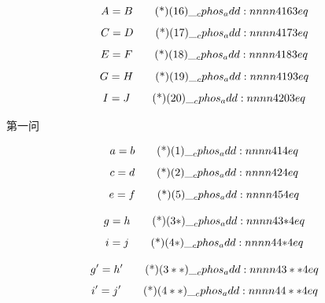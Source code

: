 \documentclass[answer]{cphos}
\begin{document}
\begin{problem}[30]{}
\begin{solution}
\begin{equation}
    A = B \eqtagscore{16}{3}
\end{equation}
\begin{equation}
    C = D \eqtagscore{17}{3}
\end{equation}
\begin{equation}
    E = F \eqtagscore{18}{3}
\end{equation}
\begin{equation}
    G = H \eqtagscore{19}{3}
\end{equation}
\begin{equation}
    I = J \eqtagscore{20}{3}
\end{equation}
\scoring
\end{solution}
\end{problem}

\begin{problem}[20]{}

\begin{problemstatement}
 第一问
\end{problemstatement}

\begin{solution}
\begin{equation}
    a = b \eqtagscore{1}{4}
\end{equation}
\begin{equation}
    c = d \eqtagscore{2}{4}
\end{equation}
\begin{equation}
    e = f \eqtagscore{5}{4}
\end{equation}
\begin{multisol}
\item
\begin{equation}
    g = h \eqtagscore{3*}{4}
\end{equation}
\begin{equation}
    i = j \eqtagscore{4*}{4}
\end{equation}
\item
\begin{equation}
    g' = h' \eqtagscore{3**}{4}
\end{equation}
\begin{equation}
    i' = j' \eqtagscore{4**}{4}
\end{equation}
\end{multisol}
\scoring
\end{solution}
\end{problem}
\end{document}

